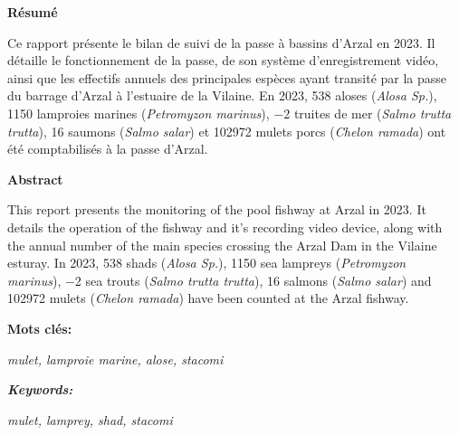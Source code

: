 \documentclass[11pt,twocolumn,titlepage,twoside]{article}\usepackage[]{graphicx}\usepackage[]{color}
\begin{document}
\onecolumn
\thispagestyle{empty}
\pagecolor{bleu_EV}
\begin{tcolorbox}[enhanced jigsaw,
                  colback=turquoise_EV!30,%
                  colframe=turquoise_EV,%
                  width=\textwidth,%
                  arc=3mm, auto outer arc,
                  boxrule=5pt,
                  drop shadow={bleu_EV!50!gray!80}
                 ]
\textbf{Résumé}\par

 \vspace{8mm}
    
 Ce rapport présente le bilan de suivi de la passe à bassins d'Arzal en
    \textcolor{orange_EV}{\num{2023}}. Il détaille le fonctionnement de la passe, de son système
    d'enregistrement vidéo, ainsi que les effectifs annuels des principales
    espèces ayant transité par la passe du barrage d'Arzal à l'estuaire de la
    Vilaine. En \textcolor{orange_EV}{\num{2023}}, 
    \textcolor{orange_EV}{\num{538}} aloses (\textit{Alosa
    Sp.}), 
    \textcolor{orange_EV}{\num{1150}} lamproies marines (\textit{Petromyzon
    marinus}), 
    \textcolor{orange_EV}{\num{-2}} truites de mer (\textit{Salmo trutta trutta}),
    \textcolor{orange_EV}{\num{16}} saumons (\textit{Salmo salar}) et
    \textcolor{orange_EV}{\num{102972}} mulets porcs (\textit{Chelon ramada}) ont été
    comptabilisés à la passe d'Arzal.  \par
        
   \vspace{8mm}
    
   \textbf{Abstract}\par
   
    \vspace{8mm}
  
    This report presents the monitoring of the pool fishway at Arzal in
    \textcolor{orange_EV}{\num{2023}}. It details the operation of the fishway and it's recording video
    device, along with the annual number of the main species crossing the Arzal
    Dam in the Vilaine esturay.
    In \textcolor{orange_EV}{\num{2023}}, 
    \textcolor{orange_EV}{\num{538}} shads (\textit{Alosa Sp.}),
    \textcolor{orange_EV}{\num{1150}} sea lampreys (\textit{Petromyzon marinus}), 
    \textcolor{orange_EV}{\num{-2}} sea trouts (\textit{Salmo trutta trutta}),
    \textcolor{orange_EV}{\num{16}} salmons (\textit{Salmo salar}) 
    and \textcolor{orange_EV}{\num{102972}} mulets (\textit{Chelon ramada}) have been
    counted at the Arzal fishway. \par

   

    \vspace{8mm}
    \textbf{Mots clés:}\par
     \textit{mulet, lamproie marine, alose, stacomi}\par 
    \vspace{8mm}    
     \textbf{\textit{Keywords:}}\par
     \textit{mulet, lamprey, shad, stacomi}  
\end{tcolorbox}
\end{document}
